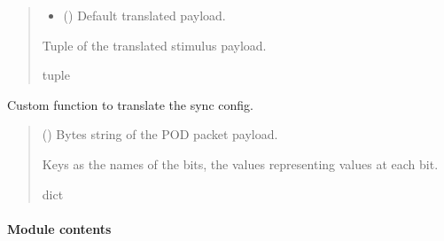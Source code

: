 \documentclass[letterpaper,10pt,english]{sphinxmanual}
\begin{document}
\begin{fulllineitems}
\begin{fulllineitems}
\begin{quote}
\begin{description}
\begin{itemize}
\item {} 
\sphinxAtStartPar
{} () \textendash{} Default translated payload.

\end{itemize}

\sphinxAtStartPar
Tuple of the translated stimulus payload.

\sphinxAtStartPar
tuple

\end{description}\end{quote}

\end{fulllineitems}


\begin{fulllineitems}
\label{\detokenize{Morelia.Devices:Morelia.Devices.PodDevice_8480SC.Pod8480SC._CustomSYNCCONFIG}}
\pysigstartsignatures
{}
\pysigstopsignatures
\sphinxAtStartPar
Custom function to translate the sync config.
\begin{quote}\begin{description}
\sphinxAtStartPar
{} () \textendash{} Bytes string of the POD packet payload.

\sphinxAtStartPar
Keys as the names of the bits, the values representing values at each bit.

\sphinxAtStartPar
dict

\end{description}\end{quote}

\end{fulllineitems}


\end{fulllineitems}



\paragraph{Module contents}
\label{\detokenize{Morelia.Devices:module-Morelia.Devices}}\label{\detokenize{Morelia.Devices:module-contents}}
\sphinxstepscope
\end{document}

